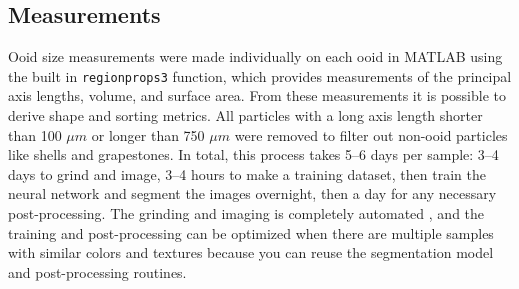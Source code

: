 \documentclass[draft]{agujournal2019}
\begin{document}
\subsection{Measurements}
Ooid size measurements were made individually on each ooid in MATLAB using the built in \texttt{regionprops3} function, which provides measurements of the principal axis lengths, volume, and surface area. From these measurements it is possible to derive shape and sorting metrics. All particles with a long axis length shorter than 100 \(\mu m\) or longer than 750 \(\mu m\) were removed to filter out non-ooid particles like shells and grapestones. In total, this process takes 5--6 days per sample: 3--4 days to grind and image, 3--4 hours to make a training dataset, then train the neural network and segment the images overnight, then a day for any necessary post-processing. The grinding and imaging is completely automated \cite{mehra2018multiscale}, and the training and post-processing can be optimized when there are multiple samples with similar colors and textures because you can reuse the segmentation model and post-processing routines. 

\end{document}
